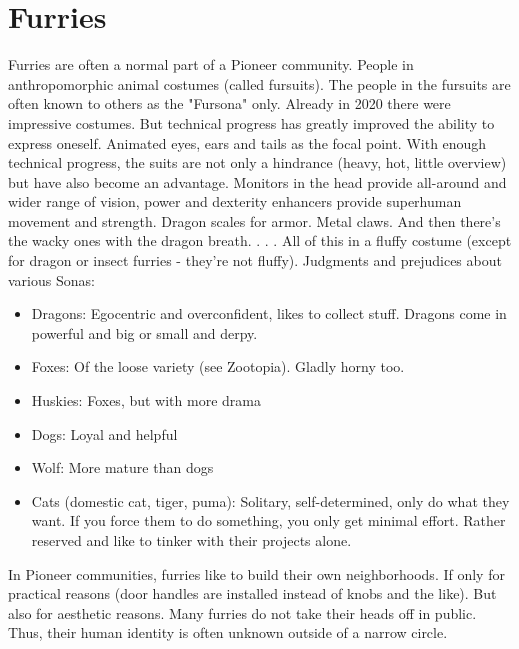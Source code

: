 \section{Furries}
Furries are often a normal part of a Pioneer community. People in anthropomorphic animal costumes (called fursuits). The people in the fursuits are often known to others as the "Fursona" only.
Already in 2020 there were impressive costumes. But technical progress has greatly improved the ability to express oneself. Animated eyes, ears and tails as the focal point.
With enough technical progress, the suits are not only a hindrance (heavy, hot, little overview) but have also become an advantage. Monitors in the head provide all-around and wider range of vision, power and dexterity enhancers provide superhuman movement and strength. Dragon scales for armor. Metal claws. And then there's the wacky ones with the dragon breath. . . .
All of this in a fluffy costume (except for dragon or insect furries - they're not fluffy).
Judgments and prejudices about various Sonas: 

\begin{itemize}
    \item Dragons: Egocentric and overconfident, likes to collect stuff. Dragons come in powerful and big or small and derpy.
    \item Foxes: Of the loose variety (see Zootopia). Gladly horny too.
    \item Huskies: Foxes, but with more drama
    \item Dogs: Loyal and helpful
    \item Wolf: More mature than dogs
    \item Cats (domestic cat, tiger, puma): Solitary, self-determined, only do what they want. If you force them to do something, you only get minimal effort. Rather reserved and like to tinker with their projects alone.
\end{itemize}

In Pioneer communities, furries like to build their own neighborhoods. If only for practical reasons (door handles are installed instead of knobs and the like). But also for aesthetic reasons.
Many furries do not take their heads off in public. Thus, their human identity is often unknown outside of a narrow circle.